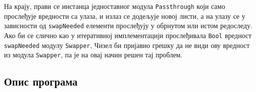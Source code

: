 \documentclass[12pt, a4paper]{article}
\theoremstyle{definition}
\begin{document}

На крају, прави се инстанца једноставног модула \verb+Passthrough+ који само прослеђује вредности са улаза, и излаз се додељује новој листи, а на улазу се у зависности од \verb+swapNeeded+ елементи прослеђују у обрнутом или истом редоследу. Ако би се слично као у итеративној имплементацији прослеђивала \verb+Bool+ вредност \verb+swapNeeded+ модулу \verb+Swapper+, Чизел би пријавио грешку да не види ову вредност из модула \verb+Swapper+, па је на овај начин решен тај проблем.

\subsection{Опис програма}
\end{document}
